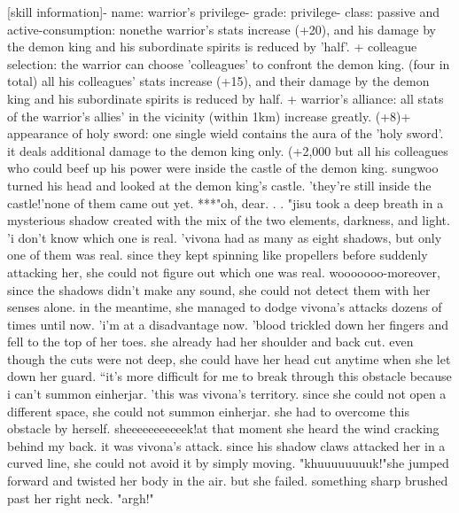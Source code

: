 [skill information]- name: warrior's privilege- grade: privilege- class: passive and active-consumption: nonethe warrior's stats increase (+20), and his damage by the demon king and his subordinate spirits is reduced by 'half'.
+ colleague selection: the warrior can choose 'colleagues' to confront the demon king.
 (four in total) all his colleagues' stats increase (+15), and their damage by the demon king and his subordinate spirits is reduced by half.
+ warrior's alliance: all stats of the warrior's allies' in the vicinity (within 1km) increase greatly.
 (+8)+ appearance of holy sword: one single wield contains the aura of the 'holy sword'.
 it deals additional damage to the demon king only.
 (+2,000%
but all his colleagues who could beef up his power were inside the castle of the demon king.
sungwoo turned his head and looked at the demon king's castle.
'they're still inside the castle!'none of them came out yet.
***"oh, dear.
.
.
"jisu took a deep breath in a mysterious shadow created with the mix of the two elements, darkness, and light.
'i don't know which one is real.
'vivona had as many as eight shadows, but only one of them was real.
since they kept spinning like propellers before suddenly attacking her, she could not figure out which one was real.
wooooooo-moreover, since the shadows didn't make any sound, she could not detect them with her senses alone.
in the meantime, she managed to dodge vivona's attacks dozens of times until now.
'i'm at a disadvantage now.
'blood trickled down her fingers and fell to the top of her toes.
she already had her shoulder and back cut.
 even though the cuts were not deep, she could have her head cut anytime when she let down her guard.
``it's more difficult for me to break through this obstacle because i can't summon einherjar.
'this was vivona's territory.
 since she could not open a different space, she could not summon einherjar.
 she had to overcome this obstacle by herself.
sheeeeeeeeeeek!at that moment she heard the wind cracking behind my back.
 it was vivona's attack.
since his shadow claws attacked her in a curved line, she could not avoid it by simply moving.
"khuuuuuuuuk!"she jumped forward and twisted her body in the air.
but she failed.
 something sharp brushed past her right neck.
"argh!"

